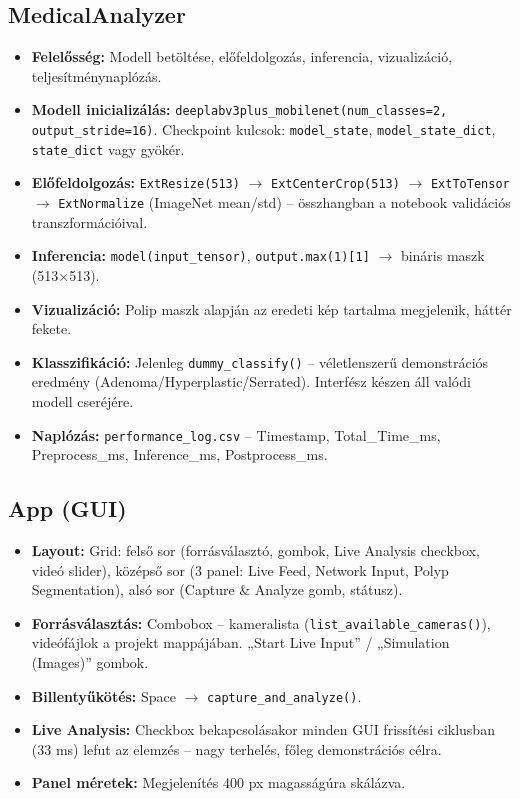 \documentclass[12pt, a4paper]{report}
\begin{document}
\subsection{MedicalAnalyzer}
\begin{itemize}
    \item \textbf{Felelősség:} Modell betöltése, előfeldolgozás, inferencia, vizualizáció, teljesítménynaplózás.
    \item \textbf{Modell inicializálás:} \texttt{deeplabv3plus\_mobilenet(num\_classes=2, output\_stride=16)}. Checkpoint kulcsok: \texttt{model\_state}, \texttt{model\_state\_dict}, \texttt{state\_dict} vagy gyökér.
    \item \textbf{Előfeldolgozás:} \texttt{ExtResize(513)} $\rightarrow$ \texttt{ExtCenterCrop(513)} $\rightarrow$ \texttt{ExtToTensor} $\rightarrow$ \texttt{ExtNormalize} (ImageNet mean/std) – összhangban a notebook validációs transzformációival.
    \item \textbf{Inferencia:} \texttt{model(input\_tensor)}, \texttt{output.max(1)[1]} $\rightarrow$ bináris maszk (513×513).
    \item \textbf{Vizualizáció:} Polip maszk alapján az eredeti kép tartalma megjelenik, háttér fekete.
    \item \textbf{Klasszifikáció:} Jelenleg \texttt{dummy\_classify()} – véletlenszerű demonstrációs eredmény (Adenoma/Hyperplastic/Serrated). Interfész készen áll valódi modell cseréjére.
    \item \textbf{Naplózás:} \texttt{performance\_log.csv} – Timestamp, Total\_Time\_ms, Preprocess\_ms, Inference\_ms, Postprocess\_ms.
\end{itemize}

\subsection{App (GUI)}
\begin{itemize}
    \item \textbf{Layout:} Grid: felső sor (forrásválasztó, gombok, Live Analysis checkbox, videó slider), középső sor (3 panel: Live Feed, Network Input, Polyp Segmentation), alsó sor (Capture \& Analyze gomb, státusz).
    \item \textbf{Forrásválasztás:} Combobox – kameralista (\texttt{list\_available\_cameras()}), videófájlok a projekt mappájában. „Start Live Input” / „Simulation (Images)” gombok.
    \item \textbf{Billentyűkötés:} Space $\rightarrow$ \texttt{capture\_and\_analyze()}.
    \item \textbf{Live Analysis:} Checkbox bekapcsolásakor minden GUI frissítési ciklusban (33 ms) lefut az elemzés – nagy terhelés, főleg demonstrációs célra.
    \item \textbf{Panel méretek:} Megjelenítés 400 px magasságúra skálázva.
\end{itemize}
\end{document}
